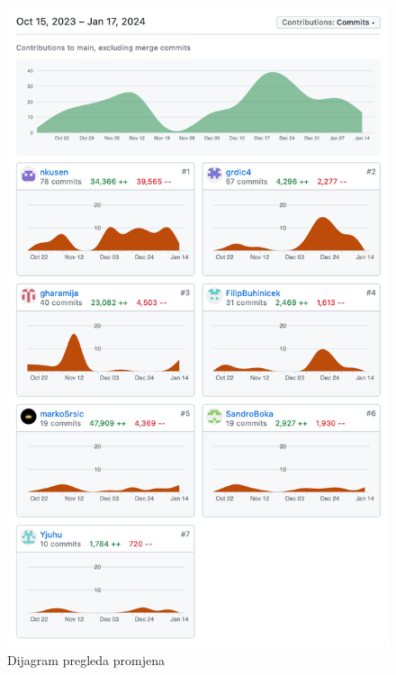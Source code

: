 		
		\begin{figure}[H]
			\includegraphics[scale=0.7]{slike/commits.png}
			\centering
			\caption{Dijagram pregleda promjena}
			\label{fig:promjene}
		\end{figure}
	